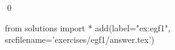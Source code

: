 
\begin{ex} 
  \label{ex:egf1}
  
  \qed
\end{ex} 
\begin{python0}
from solutions import *
add(label="ex:egf1",
    srcfilename='exercises/egf1/answer.tex') 
\end{python0}
